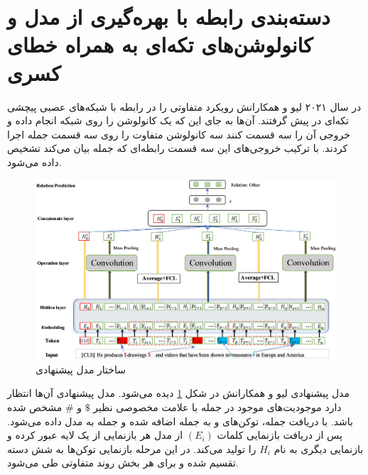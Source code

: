\section{دسته‌بندی رابطه با بهره‌گیری از مدل  و کانولوشن‌های تکه‌ای به همراه خطای کسری \cite{bert}}

در سال ۲۰۲۱ لیو و همکارانش رویکرد متفاوتی را در رابطه با شبکه‌های عصبی پیچشی تکه‌ای در پیش گرفتند.
آن‌ها به جای این که یک کانولوشن را روی شبکه انجام داده و خروجی آن‌ را سه قسمت کنند سه کانولوشن متفاوت را
روی سه قسمت جمله اجرا کردند. با ترکیب خروجی‌های این سه قسمت رابطه‌ای که جمله بیان می‌کند تشخیص داده می‌شود.

\begin{figure}[h]
    \centering
    \includegraphics[width=\linewidth]{images/bert/architecture.png}
    \caption{ساختار مدل پیشنهادی}
    \label{article1_architecture}
\end{figure}

مدل پیشنهادی لیو و همکارانش در شکل \ref{article1_architecture} دیده می‌شود. مدل پیشنهادی آن‌ها انتظار دارد موجودیت‌های موجود
در جمله با علامت مخصوصی نظیر $\$$ و $\#$ مشخص شده باشد. با دریافت جمله، توکن‌های \lr{[CLS]} و
\lr{[SEP]} به جمله اضافه شده و جمله به مدل  داده می‌شود. پس از دریافت بازنمایی کلمات $(E_i)$ از مدل  هر
بازنمایی از یک لایه  عبور کرده و بازنمایی دیگری به نام $H_i$ را تولید می‌کند. در این مرحله بازنمایی توکن‌ها
به شش دسته تقسیم شده و برای هر بخش روند متفاوتی طی می‌شود.

